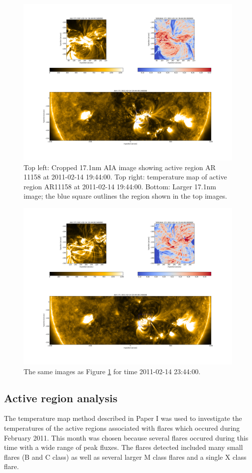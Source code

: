 \documentclass[referee,a4paper,12pt]{swsc}
\begin{document}
\begin{linenumbers}
\begin{figure}
	\centering
		\includegraphics[width=0.9\columnwidth]{20110214T194400with171.png}
	\caption{Top left: Cropped 17.1nm AIA image showing active region AR 11158 at 2011-02-14 19:44:00. Top right: temperature map of active region AR11158 at 2011-02-14 19:44:00. Bottom: Larger 17.1nm image; the blue square outlines the region shown in the top images.}
	\label{fig:trackdemo1}
\end{figure}
\begin{figure}
	\centering
		\includegraphics[width=0.9\columnwidth]{20110214T234400with171.png}
	\caption{The same images as Figure \ref{fig:trackdemo1} for time 2011-02-14 23:44:00.}
	\label{fig:trackdemo2}
\end{figure}

\subsection{Active region analysis}
The temperature map method described in Paper I was used to investigate the temperatures of the active regions associated with flares which occured during February 2011.
This month was chosen because several flares occured during this time with a wide range of peak fluxes.
The flares detected included many small flares (B and C class) as well as several larger M class flares and a single X class flare.


\end{linenumbers}
\end{document}
